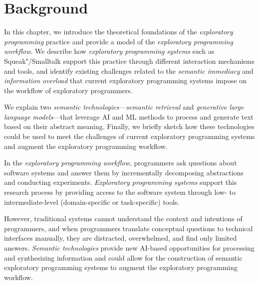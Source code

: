 
\chapter{Background}
\label{cha:background}

In this chapter, we introduce the theoretical foundations of the \emph{exploratory programming} practice and provide a model of the \emph{exploratory programming workflow}.
We describe how \emph{exploratory programming systems} such as Squeak"/Smalltalk support this practice through different interaction mechanisms and tools, and identify existing challenges related to the \emph{semantic immediacy} and \emph{information overload} that current exploratory programming systems impose on the workflow of exploratory programmers.

We explain two \emph{semantic technologies}---\emph{semantic retrieval} and \emph{generative large language models}---that leverage AI and ML methods to process and generate text based on their abstract meaning.
Finally, we briefly sketch how these technologies could be used to meet the challenges of current exploratory programming systems and augment the exploratory programming workflow.


\begin{summary}
	In the \emph{exploratory programming workflow}, programmers ask questions about software systems and answer them by incrementally decomposing abstractions and conducting experiments.
	\emph{Exploratory programming systems} support this research process by providing access to the software system through low- to intermediate-level (domain-specific or task-specific) tools.

	However, traditional systems cannot understand the context and intentions of programmers, and when programmers translate conceptual questions to technical interfaces manually, they are distracted, overwhelmed, and find only limited answers.
	\emph{Semantic technologies} provide new AI-based opportunities for processing and synthesizing information and could allow for the construction of semantic exploratory programming systems to augment the exploratory programming workflow.
\end{summary}

